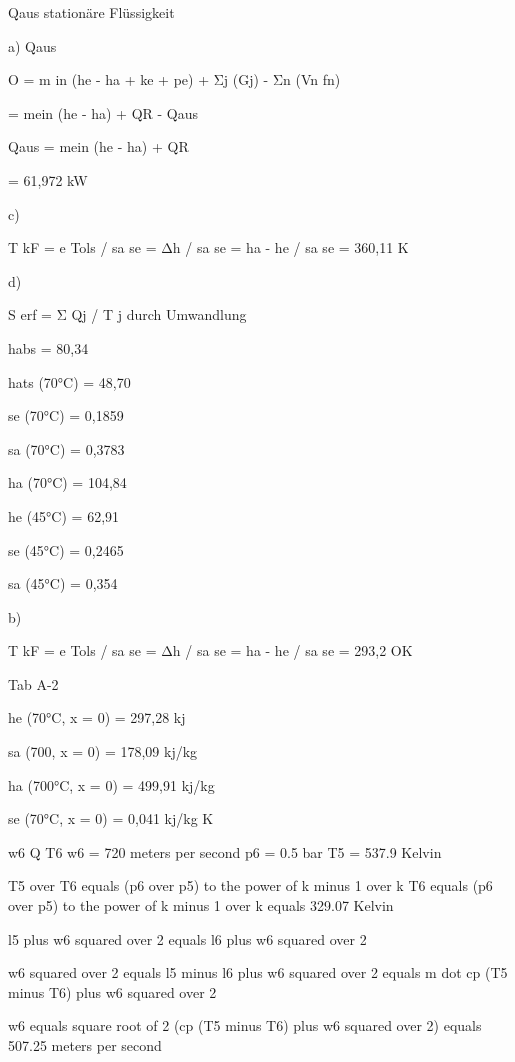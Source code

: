 Qaus stationäre Flüssigkeit

a) Qaus

O = m in (he - ha + ke + pe) + Σj (Gj) - Σn (Vn fn)

= mein (he - ha) + QR - Qaus

Qaus = mein (he - ha) + QR

= 61,972 kW

c)

T kF = e Tols / sa se = Δh / sa se = ha - he / sa se = 360,11 K

d)

S erf = Σ Qj / T j durch Umwandlung

habs = 80,34

hats (70°C) = 48,70

se (70°C) = 0,1859

sa (70°C) = 0,3783

ha (70°C) = 104,84

he (45°C) = 62,91

se (45°C) = 0,2465

sa (45°C) = 0,354

b)

T kF = e Tols / sa se = Δh / sa se = ha - he / sa se = 293,2 OK

Tab A-2

he (70°C, x = 0) = 297,28 kj

sa (700, x = 0) = 178,09 kj/kg

ha (700°C, x = 0) = 499,91 kj/kg

se (70°C, x = 0) = 0,041 kj/kg K

w6 Q T6  
w6 = 720 meters per second  
p6 = 0.5 bar  
T5 = 537.9 Kelvin  

T5 over T6 equals (p6 over p5) to the power of k minus 1 over k  
T6 equals (p6 over p5) to the power of k minus 1 over k  
equals 329.07 Kelvin  

l5 plus w6 squared over 2 equals l6 plus w6 squared over 2  

w6 squared over 2 equals l5 minus l6 plus w6 squared over 2  
equals m dot cp (T5 minus T6) plus w6 squared over 2  

w6 equals square root of 2 (cp (T5 minus T6) plus w6 squared over 2)  
equals 507.25 meters per second